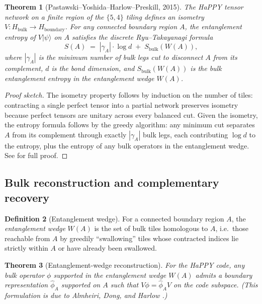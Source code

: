 \documentclass[12pt]{article}
\newtheorem{theorem}{Theorem}[section]
\theoremstyle{definition}
\newtheorem{definition}[theorem]{Definition}
\theoremstyle{remark}
\begin{document}
\begin{theorem}[Pastawski--Yoshida--Harlow--Preskill, 2015]
\label{thm:happy}
The HaPPY tensor network on a finite region of the $\{5,4\}$ tiling defines an isometry $V\colon H_{\mathrm{bulk}} \to H_{\mathrm{boundary}}$. For any connected boundary region $A$, the entanglement entropy of $V|\psi\rangle$ on $A$ satisfies the discrete Ryu--Takayanagi formula
\[
S(A) \;=\; |\gamma_A| \cdot \log d \;+\; S_{\mathrm{bulk}}(W(A)),
\]
where $|\gamma_A|$ is the minimum number of bulk legs cut to disconnect $A$ from its complement, $d$ is the bond dimension, and $S_{\mathrm{bulk}}(W(A))$ is the bulk entanglement entropy in the entanglement wedge $W(A)$.
\end{theorem}

\begin{proof}[Proof sketch]
The isometry property follows by induction on the number of tiles: contracting a single perfect tensor into a partial network preserves isometry because perfect tensors are unitary across every balanced cut. Given the isometry, the entropy formula follows by the greedy algorithm: any minimum cut separates $A$ from its complement through exactly $|\gamma_A|$ bulk legs, each contributing $\log d$ to the entropy, plus the entropy of any bulk operators in the entanglement wedge. See \cite{pyhp2015} for full proof.
\end{proof}

\subsection{Bulk reconstruction and complementary recovery}

\begin{definition}[Entanglement wedge]
\label{def:ew}
For a connected boundary region $A$, the \emph{entanglement wedge} $W(A)$ is the set of bulk tiles homologous to $A$, i.e.\ those reachable from $A$ by greedily ``swallowing'' tiles whose contracted indices lie strictly within $A$ or have already been swallowed.
\end{definition}

\begin{theorem}[Entanglement-wedge reconstruction]
\label{thm:ewr}
For the HaPPY code, any bulk operator $\phi$ supported in the entanglement wedge $W(A)$ admits a boundary representation $\hat\phi_A$ supported on $A$ such that $V\phi = \hat\phi_A V$ on the code subspace. (This formulation is due to Almheiri, Dong, and Harlow \cite{almheiridongharlow2015}.)
\end{theorem}
\end{document}
